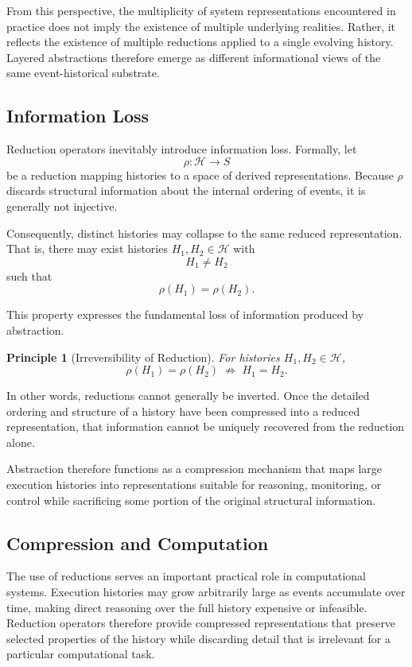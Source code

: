 \documentclass[12pt]{article}
\newtheorem{principle}{Principle}
\begin{document}
From this perspective, the multiplicity of system
representations encountered in practice does not imply
the existence of multiple underlying realities. Rather,
it reflects the existence of multiple reductions applied
to a single evolving history. Layered abstractions therefore
emerge as different informational views of the same
event-historical substrate.

\subsection{Information Loss}

Reduction operators inevitably introduce information loss.
Formally, let
\[
\rho : \mathcal{H} \rightarrow S
\]
be a reduction mapping histories to a space of derived
representations. Because $\rho$ discards structural
information about the internal ordering of events,
it is generally not injective.

Consequently, distinct histories may collapse to the
same reduced representation. That is, there may exist
histories $H_1, H_2 \in \mathcal{H}$ with
\[
H_1 \neq H_2
\]
such that
\[
\rho(H_1) = \rho(H_2).
\]

This property expresses the fundamental loss of
information produced by abstraction.

\begin{principle}[Irreversibility of Reduction]
For histories $H_1, H_2 \in \mathcal{H}$,
\[
\rho(H_1) = \rho(H_2) \;\not\Rightarrow\; H_1 = H_2.
\]
\end{principle}

In other words, reductions cannot generally be inverted.
Once the detailed ordering and structure of a history
have been compressed into a reduced representation,
that information cannot be uniquely recovered from the
reduction alone.

Abstraction therefore functions as a compression
mechanism that maps large execution histories into
representations suitable for reasoning, monitoring,
or control while sacrificing some portion of the
original structural information.

\subsection{Compression and Computation}

The use of reductions serves an important practical
role in computational systems. Execution histories may
grow arbitrarily large as events accumulate over time,
making direct reasoning over the full history expensive
or infeasible. Reduction operators therefore provide
compressed representations that preserve selected
properties of the history while discarding detail
that is irrelevant for a particular computational
task.
\end{document}
